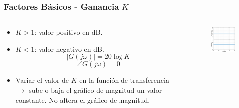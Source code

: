 \documentclass[aspectratio=169, handout]{beamer}
\theoremstyle{definition}
\theoremstyle{plain}
\theoremstyle{remark}
\begin{document}
\begin{frame}[<+->]\frametitle{Factores Básicos - Ganancia $K$}
\begin{columns}
	\begin{column}{0.5\textwidth}
	\begin{itemize}
		\item $K > 1$: valor positivo en dB.
		\item $K < 1$: valor negativo en dB.
		\begin{equation*}
			\left| G(j\omega) \right| = 20 \log K
		\end{equation*}
		\begin{equation*}
			\angle G(j\omega) = 0
		\end{equation*}
		\item Variar el valor de $K$ en la función de transferencia $\rightarrow$ sube o baja el gráfico de magnitud un valor constante. No altera el gráfico de magnitud.
	\end{itemize}
	\end{column}
	\begin{column}{0.5\textwidth}
		\begin{figure}
			\includegraphics[width=6.5cm]{images/bodeGainK.eps}
		\end{figure}
	\end{column}
\end{columns}
\end{frame}
\end{document}
